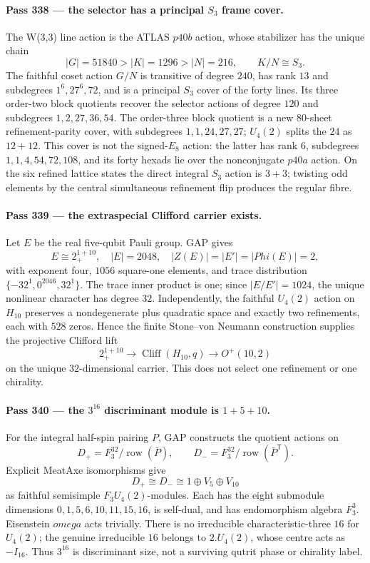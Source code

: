 \documentclass[12pt,a4paper]{article}
\def\mathbb#1{#1}%
\def\mathbf#1{#1}%
\def\omega{omega}%
\def\Phi#1{Phi#1}%
\theoremstyle{definition}
\newcommand{\FF}{\mathbb{F}}
\begin{document}
\paragraph{Pass 338 --- the selector has a principal $S_3$ frame cover.}
The W(3,3) line action is the ATLAS $p40b$ action, whose stabilizer has the
unique chain
\[
 |G|=51840>|K|=1296>|N|=216,\qquad K/N\cong S_3.
\]
The faithful coset action $G/N$ is transitive of degree $240$, has rank $13$
and subdegrees $1^6,27^6,72$, and is a principal $S_3$ cover of the forty
lines.  Its three order-two block quotients recover the selector actions of
degree $120$ and subdegrees $1,2,27,36,54$.  The order-three block quotient is
a new $80$-sheet refinement-parity cover, with subdegrees $1,1,24,27,27$;
$U_4(2)$ splits the $24$ as $12+12$.  This cover is not the signed-$E_8$
action: the latter has rank $6$, subdegrees $1,1,4,54,72,108$, and its forty
hexads lie over the nonconjugate $p40a$ action.  On the six refined lattice
states the direct integral $S_3$ action is $3+3$; twisting odd elements by the
central simultaneous refinement flip produces the regular fibre.

\paragraph{Pass 339 --- the extraspecial Clifford carrier exists.}
Let $E$ be the real five-qubit Pauli group.  GAP gives
\[
 E\cong 2_+^{1+10},\quad |E|=2048,\quad
 |Z(E)|=|E'|=|\Phi(E)|=2,
\]
with exponent four, $1056$ square-one elements, and trace distribution
$\{-32^1,0^{2046},32^1\}$.  The trace inner product is one; since
$|E/E'|=1024$, the unique nonlinear character has degree $32$.  Independently,
the faithful $U_4(2)$ action on $H_{10}$ preserves a nondegenerate plus
quadratic space and exactly two refinements, each with $528$ zeros.  Hence the
finite Stone--von Neumann construction supplies the projective Clifford lift
\[
 2_+^{1+10}\longrightarrow \operatorname{Cliff}(H_{10},q)
 \longrightarrow O^+(10,2)
\]
on the unique $32$-dimensional carrier.  This does not select one refinement or
one chirality.

\paragraph{Pass 340 --- the $3^{16}$ discriminant module is $1+5+10$.}
For the integral half-spin pairing $P$, GAP constructs the quotient actions on
\[
 D_+=\FF_3^{32}/\operatorname{row}(\bar P),\qquad
 D_-=\FF_3^{32}/\operatorname{row}(\bar P^{\mathsf T}).
\]
Explicit MeatAxe isomorphisms give
\[
 D_+\cong D_-\cong \mathbf1\oplus V_5\oplus V_{10}
\]
as faithful semisimple $\FF_3U_4(2)$-modules.  Each has the eight submodule
dimensions $0,1,5,6,10,11,15,16$, is self-dual, and has endomorphism algebra
$\FF_3^3$.  Eisenstein $\omega$ acts trivially.  There is no irreducible
characteristic-three $16$ for $U_4(2)$; the genuine irreducible $16$ belongs to
$2.U_4(2)$, whose centre acts as $-I_{16}$.  Thus $3^{16}$ is discriminant
size, not a surviving qutrit phase or chirality label.
\end{document}
